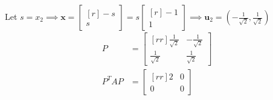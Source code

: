 \documentclass{article}
\newcommand\ddfrac[2]{\frac{\displaystyle #1}{\displaystyle #2}}
\begin{document}
\begin{minipage}{0.499\linewidth}
        Let $s = x_2 \implies \textbf{x} = \begin{bmatrix}[r]
            -s \\
            s
        \end{bmatrix} = s \begin{bmatrix}[r]
            -1 \\
            1 
        \end{bmatrix} \implies \textbf{u}_2 = \left( - \ddfrac{1}{\sqrt{2}} , \ddfrac{1}{\sqrt{2}}  \right)$
        \begin{equation*}
            \begin{split}
                P &= \begin{bmatrix}[rr]
            \frac{1}{\sqrt{2}} & -\frac{1}{\sqrt{2}} \\
            \frac{1}{\sqrt{2}} & \frac{1}{\sqrt{2}}
        \end{bmatrix} \\
                    P^TAP &= \begin{bmatrix}[rr]
                        2 & 0 \\
                        0 & 0
                    \end{bmatrix} 
            \end{split}
        \end{equation*}
    \end{minipage}
\end{document}
